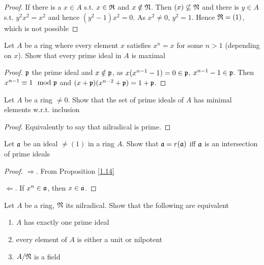 \documentclass[11pt]{article}
\begin{document}
\begin{proof}
If there is a \(x\in A\) s.t. \(x\in\mathfrak{R}\) and \(x\notin\mathfrak{N}\). Then \((x)\not\subseteq\mathfrak{N}\) and there is \(y\in A\)
s.t. \(y^2x^2=x^2\) and hence \((y^2-1)x^2=0\). As \(x^2\neq 0\), \(y^2=1\). Hence \(\mathfrak{R}=(1)\), which is not possible
\end{proof}

\begin{exercise}
\label{ex1.7}
Let \(A\) be a ring where every element \(x\) satisfies \(x^n=x\) for some \(n>1\) (depending
on \(x\)). Show that every prime ideal in \(A\) is maximal
\end{exercise}

\begin{proof}
\(\mathfrak{p}\) the prime ideal and \(x\notin\mathfrak{p}\), as \(x(x^{n-1}-1)=0\in\mathfrak{p}\), \(x^{n-1}-1\in\mathfrak{p}\).
Then \(x^{n-1}\equiv 1\mod{\mathfrak{p}}\) and \((x+\mathfrak{p})(x^{n-2}+\mathfrak{p})=1+\mathfrak{p}\).
\end{proof}

\begin{exercise}
\label{ex1.8}
Let \(A\) be a ring \(\neq 0\). Show that the set of prime ideals of \(A\) has minimal elements
w.r.t. inclusion
\end{exercise}

\begin{proof}
Equivalently to say that nilradical is prime.
\end{proof}

\begin{exercise}
\label{ex1.9}
Let \(\mathfrak{a}\) be an ideal \(\neq(1)\) in a ring \(A\). Show that \(\mathfrak{a}=r(\mathfrak{a})\) iff \(\mathfrak{a}\) is an
intersection of prime ideals
\end{exercise}

\begin{proof}
\(\Rightarrow\). From Proposition \ref{1.14}

\(\Leftarrow\). If \(x^n\in\mathfrak{a}\), then \(x\in\mathfrak{a}\).
\end{proof}

\begin{exercise}
\label{ex1.10}
Let \(A\) be a ring, \(\mathfrak{N}\) its nilradical. Show that the following are equivalent
\begin{enumerate}
\item \(A\) has exactly one prime ideal
\item every element of \(A\) is either a unit or nilpotent
\item \(A/\mathfrak{N}\) is a field
\end{enumerate}
\end{exercise}
\end{document}
